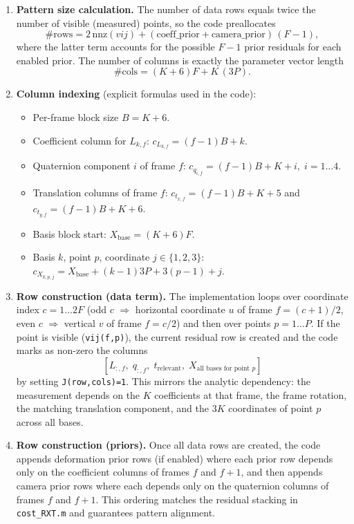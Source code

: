 \documentclass{article}
\begin{document}
\begin{enumerate}
	\item \textbf{Pattern size calculation.} The number of data rows equals twice the number of visible (measured) points, so the code preallocates
		\[ \#\text{rows} = 2\,\mathrm{nnz}(vij) + (\text{coeff\_prior} + \text{camera\_prior})\,(F-1), \]
		where the latter term accounts for the possible $F-1$ prior residuals for each enabled prior. The number of columns is exactly the parameter vector length
		\[ \#\text{cols} = (K+6)F + K\,(3P). \]

	\item \textbf{Column indexing} (explicit formulas used in the code):
		\begin{itemize}
			\item Per-frame block size $B = K+6$.
			\item Coefficient column for $L_{k,f}$: $c_{L_{k,f}} = (f-1)B + k$.
			\item Quaternion component $i$ of frame $f$: $c_{q_{i,f}} = (f-1)B + K + i,\; i=1\ldots4$.
			\item Translation columns of frame $f$: $c_{t_{x,f}} = (f-1)B + K + 5$ and $c_{t_{y,f}} = (f-1)B + K + 6$.
			\item Basis block start: $X_{\mathrm{base}} = (K+6)F$.
			\item Basis $k$, point $p$, coordinate $j\in\{1,2,3\}$: $c_{X_{k,p,j}} = X_{\mathrm{base}} + (k-1)3P + 3(p-1) + j$.
		\end{itemize}

	\item \textbf{Row construction (data term).} The implementation loops over coordinate index $c=1\ldots 2F$ (odd $c$ $\Rightarrow$ horizontal coordinate $u$ of frame $f=(c+1)/2$, even $c$ $\Rightarrow$ vertical $v$ of frame $f=c/2$) and then over points $p=1\ldots P$. If the point is visible (\texttt{vij(f,p)}), the current residual row is created and the code marks as non-zero the columns
		\[ [L_{:,f},\; q_{:,f},\; t_{\text{relevant}},\; X_{\text{all bases for point }p}] \]
		by setting \texttt{J(row,cols)=1}. This mirrors the analytic dependency: the measurement depends on the $K$ coefficients at that frame, the frame rotation, the matching translation component, and the $3K$ coordinates of point $p$ across all bases.

	\item \textbf{Row construction (priors).} Once all data rows are created, the code appends deformation prior rows (if enabled) where each prior row depends only on the coefficient columns of frames $f$ and $f+1$, and then appends camera prior rows where each depends only on the quaternion columns of frames $f$ and $f+1$. This ordering matches the residual stacking in \texttt{cost\_RXT.m} and guarantees pattern alignment.
\end{enumerate}
\end{document}
